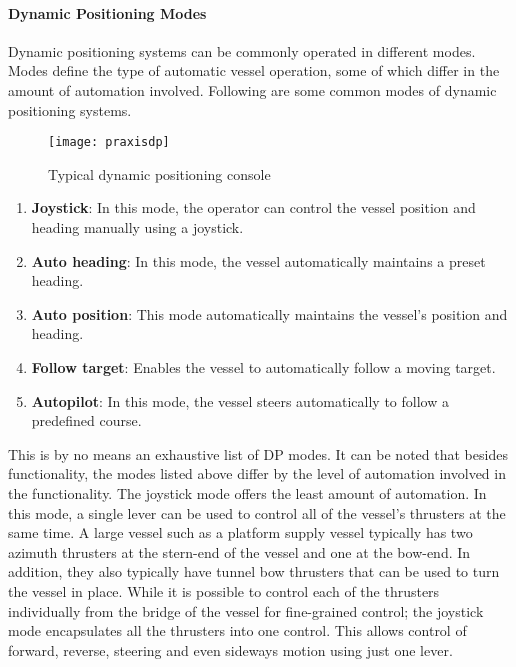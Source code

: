 \paragraph{Dynamic Positioning Modes}
Dynamic positioning systems can be commonly operated in different modes. Modes define the type of automatic vessel operation, some of which differ in the amount of automation involved. Following are some common modes of dynamic positioning systems. 

\begin{figure}
	\centering
	\texttt{[image: praxisdp]}
	\caption{Typical dynamic positioning console}
	\label{fig:praxisdp}
\end{figure}

\begin{enumerate}

\item \textbf{Joystick}: In this mode, the operator can control the vessel position and heading manually using a joystick. 
\item \textbf{Auto heading}: In this mode, the vessel automatically maintains a preset heading. 
\item \textbf{Auto position}: This mode automatically maintains the vessel's position and heading. 
\item \textbf{Follow target}: Enables the vessel to automatically follow a moving target. 
\item \textbf{Autopilot}: In this mode, the vessel steers automatically to follow a predefined course. 

\end{enumerate}

This is by no means an exhaustive list of DP modes. It can be noted that besides functionality, the modes listed above differ by the level of automation involved in the functionality.  The joystick mode offers the least amount of automation. In this mode, a single lever can be used to control all of the vessel's thrusters at the same time. A large vessel such as a platform supply vessel typically has two azimuth thrusters at the stern-end of the vessel and one at the bow-end. In addition, they also typically have tunnel bow thrusters that can be used to turn the vessel in place. While it is possible to control each of the thrusters individually from the bridge of the vessel for fine-grained control; the joystick mode encapsulates all the thrusters into one control. This allows control of forward, reverse, steering and even sideways motion using just one lever.

